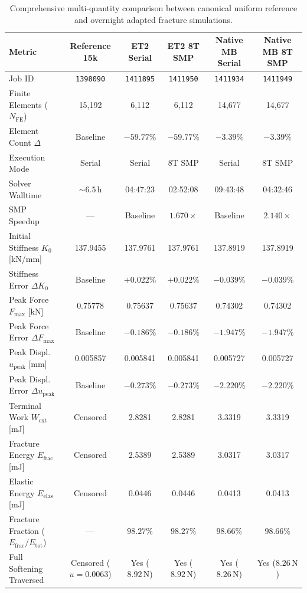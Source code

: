 \begin{table}[htbp]
\centering
\small
\caption{Comprehensive multi-quantity comparison between canonical uniform reference and overnight adapted fracture simulations.}
\label{tab:mode1_gate6b_multiquantity_summary}
\begin{tabular}{lccccc}
\hline
\textbf{Metric} & \textbf{Reference 15k} & \textbf{ET2 Serial} & \textbf{ET2 8T SMP} & \textbf{Native MB Serial} & \textbf{Native MB 8T SMP} \\
\hline
Job ID & \texttt{1398090} & \texttt{1411895} & \texttt{1411950} & \texttt{1411934} & \texttt{1411949} \\
Finite Elements ($N_{\mathrm{FE}}$) & 15,192 & 6,112 & 6,112 & 14,677 & 14,677 \\
Element Count $\Delta$ & Baseline & $-59.77\%$ & $-59.77\%$ & $-3.39\%$ & $-3.39\%$ \\
Execution Mode & Serial & Serial & 8T SMP & Serial & 8T SMP \\
Solver Walltime & $\sim 6.5\,\mathrm{h}$ & 04:47:23 & 02:52:08 & 09:43:48 & 04:32:46 \\
SMP Speedup & --- & Baseline & $\mathbf{1.670\times}$ & Baseline & $\mathbf{2.140\times}$ \\
Initial Stiffness $K_0$ [kN/mm] & 137.9455 & 137.9761 & 137.9761 & 137.8919 & 137.8919 \\
Stiffness Error $\Delta K_0$ & Baseline & $+0.022\%$ & $+0.022\%$ & $-0.039\%$ & $-0.039\%$ \\
Peak Force $F_{\max}$ [kN] & 0.75778 & 0.75637 & 0.75637 & 0.74302 & 0.74302 \\
Peak Force Error $\Delta F_{\max}$ & Baseline & $-0.186\%$ & $-0.186\%$ & $-1.947\%$ & $-1.947\%$ \\
Peak Displ. $u_{\mathrm{peak}}$ [mm] & 0.005857 & 0.005841 & 0.005841 & 0.005727 & 0.005727 \\
Peak Displ. Error $\Delta u_{\mathrm{peak}}$ & Baseline & $-0.273\%$ & $-0.273\%$ & $-2.220\%$ & $-2.220\%$ \\
Terminal Work $W_{\mathrm{ext}}$ [mJ] & Censored & 2.8281 & 2.8281 & 3.3319 & 3.3319 \\
Fracture Energy $E_{\mathrm{frac}}$ [mJ] & Censored & 2.5389 & 2.5389 & 3.0317 & 3.0317 \\
Elastic Energy $E_{\mathrm{elas}}$ [mJ] & Censored & 0.0446 & 0.0446 & 0.0413 & 0.0413 \\
Fracture Fraction ($E_{\mathrm{frac}}/E_{\mathrm{tot}}$) & --- & $98.27\%$ & $98.27\%$ & $98.66\%$ & $98.66\%$ \\
Full Softening Traversed & Censored ($u=0.0063$) & Yes ($8.92\,\mathrm{N}$) & Yes ($8.92\,\mathrm{N}$) & Yes ($8.26\,\mathrm{N}$) & Yes ($8.26\,\mathrm{N}$) \\
\hline
\end{tabular}
\end{table}

